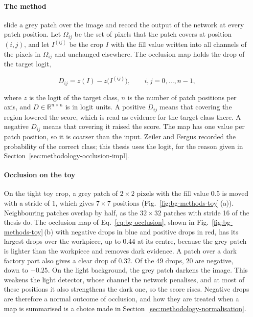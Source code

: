 \paragraph{The method}
\citet{zeilerFergus2014} slide a grey patch over the image and record
the output of the network at every patch position. Let $\Omega_{ij}$ be the set of pixels
that the patch covers at position $(i, j)$, and let $I^{(ij)}$ be the crop $I$ with the
fill value written into all channels of the pixels in $\Omega_{ij}$ and unchanged
elsewhere. The occlusion map holds the drop of the target logit,

\begin{equation}
D_{ij} = z(I) - z\big(I^{(ij)}\big), \qquad i, j = 0, \dots, n-1,
\label{eq:bg-occlusion}
\end{equation}

where $z$ is the logit of the target class, $n$ is the number of patch positions per
axis, and $D \in \mathbb{R}^{n \times n}$ is in logit units. A positive $D_{ij}$ means
that covering the region lowered the score, which is read as evidence for the target
class there. A negative $D_{ij}$ means
that covering it raised the score. The map has one value per patch position, so it is
coarser than the input. Zeiler and Fergus recorded the probability of the correct class;
this thesis uses the logit, for the reason given in
Section~\ref{sec:methodology-occlusion-impl}.

\paragraph{Occlusion on the toy}
On the tight toy crop, a grey patch of $2 \times 2$ pixels with the fill value 0.5 is
moved with a stride of 1, which gives $7 \times 7$ positions
(Fig.~\ref{fig:bg-methods-toy}\,(a)). Neighbouring patches overlap by half, as the
$32 \times 32$ patches with stride 16 of the thesis do. The occlusion map of
Eq.~\eqref{eq:bg-occlusion}, shown in Fig.~\ref{fig:bg-methods-toy}\,(b) with negative drops in blue and positive drops in red, has its
largest drops over the workpiece, up to 0.44 at its centre, because the grey patch is
lighter than the workpiece and removes dark evidence. A patch over a dark factory part
also gives a clear drop of 0.32. Of the 49 drops, 20 are negative, down to $-0.25$. On
the light background, the grey patch darkens the image. This weakens the light detector,
whose channel the network penalises, and at most of these positions it also
strengthens the dark one, so the score rises. Negative drops are therefore a normal
outcome of occlusion, and how they are treated when a map is summarised is a choice
made in Section~\ref{sec:methodology-normalisation}.

